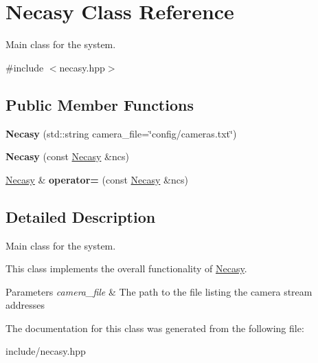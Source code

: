 \hypertarget{classNecasy}{}\section{Necasy Class Reference}
\label{classNecasy}


Main class for the system.  




{\ttfamily \#include $<$necasy.\+hpp$>$}

\subsection*{Public Member Functions}
\begin{DoxyCompactItemize}
\item 
\mbox{\label{classNecasy_a1eca91971b00239700f27630686ff667}} 
{\bfseries Necasy} (std\+::string camera\+\_\+file=\char`\"{}config/cameras.\+txt\char`\"{})
\item 
\mbox{\label{classNecasy_ac91162192f66f3e584335adf7e0e707b}} 
{\bfseries Necasy} (const \hyperlink{classNecasy}{Necasy} \&ncs)
\item 
\mbox{\label{classNecasy_a2c0610d034d82a162eb7e8173b4116bb}} 
\hyperlink{classNecasy}{Necasy} \& {\bfseries operator=} (const \hyperlink{classNecasy}{Necasy} \&ncs)
\end{DoxyCompactItemize}


\subsection{Detailed Description}
Main class for the system. 

This class implements the overall functionality of \hyperlink{classNecasy}{Necasy}.


\begin{DoxyParams}{Parameters}
{\em camera\+\_\+file} & The path to the file listing the camera stream addresses \\
\hline
\end{DoxyParams}


The documentation for this class was generated from the following file\+:\begin{DoxyCompactItemize}
\item 
include/necasy.\+hpp\end{DoxyCompactItemize}
